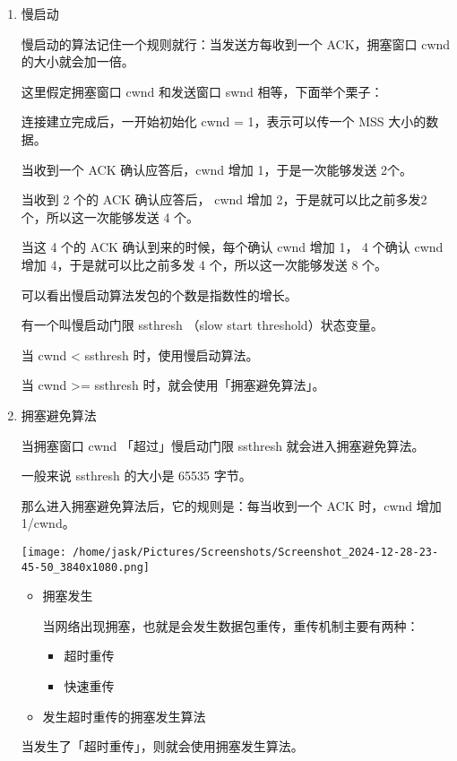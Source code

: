 \documentclass[11pt]{article}
\begin{document}
\begin{enumerate}
\item 慢启动
\label{sec:org29b5d21}

慢启动的算法记住一个规则就行：当发送方每收到一个 ACK，拥塞窗口 cwnd 的大小就会加一倍。

这里假定拥塞窗口 cwnd 和发送窗口 swnd 相等，下面举个栗子：

连接建立完成后，一开始初始化 cwnd = 1，表示可以传一个 MSS 大小的数据。

当收到一个 ACK 确认应答后，cwnd 增加 1，于是一次能够发送 2个。

当收到 2 个的 ACK 确认应答后， cwnd 增加 2，于是就可以比之前多发2 个，所以这一次能够发送 4 个。

当这 4 个的 ACK 确认到来的时候，每个确认 cwnd 增加 1， 4 个确认 cwnd 增加 4，于是就可以比之前多发 4 个，所以这一次能够发送 8 个。

可以看出慢启动算法发包的个数是指数性的增长。

有一个叫慢启动门限 ssthresh （slow start threshold）状态变量。

当 cwnd < ssthresh 时，使用慢启动算法。

当 cwnd >= ssthresh 时，就会使用「拥塞避免算法」。
\item 拥塞避免算法
\label{sec:org367fbc2}

当拥塞窗口 cwnd 「超过」慢启动门限 ssthresh 就会进入拥塞避免算法。

一般来说 ssthresh 的大小是 65535 字节。

那么进入拥塞避免算法后，它的规则是：每当收到一个 ACK 时，cwnd 增加 1/cwnd。

\begin{center}
\texttt{[image: /home/jask/Pictures/Screenshots/Screenshot\_2024-12-28-23-45-50\_3840x1080.png]}
\end{center}

\begin{itemize}
\item 拥塞发生

当网络出现拥塞，也就是会发生数据包重传，重传机制主要有两种：
\begin{itemize}
\item 超时重传

\item 快速重传
\end{itemize}
\item 发生超时重传的拥塞发生算法
\end{itemize}

当发生了「超时重传」，则就会使用拥塞发生算法。


\end{enumerate}
\end{document}
